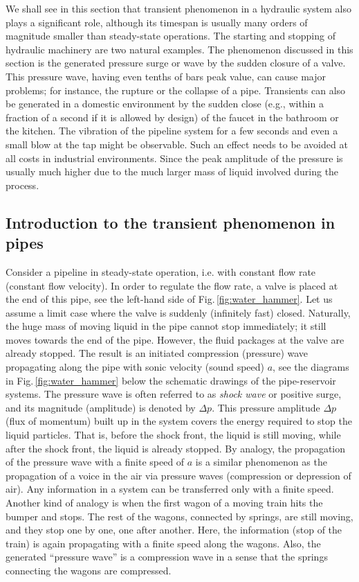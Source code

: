 We shall see in this section that transient phenomenon in a hydraulic system also plays a significant role, although its timespan is usually many orders of magnitude smaller than steady-state operations. The starting and stopping of hydraulic machinery are two natural examples. The phenomenon discussed in this section is the generated pressure surge or wave by the sudden closure of a valve. This pressure wave, having even tenths of bars peak value, can cause major problems; for instance, the rupture or the collapse of a pipe. Transients can also be generated in a domestic environment by the sudden close (e.g., within a fraction of a second if it is allowed by design) of the faucet in the bathroom or the kitchen. The vibration of the pipeline system for a few seconds and even a small blow at the tap might be observable. Such an effect needs to be avoided at all costs in industrial environments. Since the peak amplitude of the pressure is usually much higher due to the much larger mass of liquid involved during the process.

\subsection{Introduction to the transient phenomenon in pipes} \label{sec:introduction_to_transient_phenomenon}
Consider a pipeline in steady-state operation, i.e. with constant flow rate (constant flow velocity). In order to regulate the flow rate, a valve is placed at the end of this pipe, see the left-hand side of Fig.\,\ref{fig:water_hammer}. Let us assume a limit case where the valve is suddenly (infinitely fast) closed. Naturally, the huge mass of moving liquid in the pipe cannot stop immediately; it still moves towards the end of the pipe. However, the fluid packages at the valve are already stopped. The result is an initiated compression (pressure) wave propagating along the pipe with sonic velocity (sound speed) $a$, see the diagrams in Fig.\,\ref{fig:water_hammer} below the schematic drawings of the pipe-reservoir systems. The pressure wave is often referred to as \emph{shock wave} or positive surge, and its magnitude (amplitude) is denoted by $\Delta p$. This pressure amplitude $\Delta p$ (flux of momentum) built up in the system covers the energy required to stop the liquid particles. That is, before the shock front, the liquid is still moving, while after the shock front, the liquid is already stopped. By analogy, the propagation of the pressure wave with a finite speed of $a$ is a similar phenomenon as the propagation of a voice in the air via pressure waves (compression or depression of air). Any information in a system can be transferred only with a finite speed. Another kind of analogy is when the first wagon of a moving train hits the bumper and stops. The rest of the wagons, connected by springs, are still moving, and they stop one by one, one after another. Here, the information (stop of the train) is again propagating with a finite speed along the wagons. Also, the generated ``pressure wave'' is a compression wave in a sense that the springs connecting the wagons are compressed.

